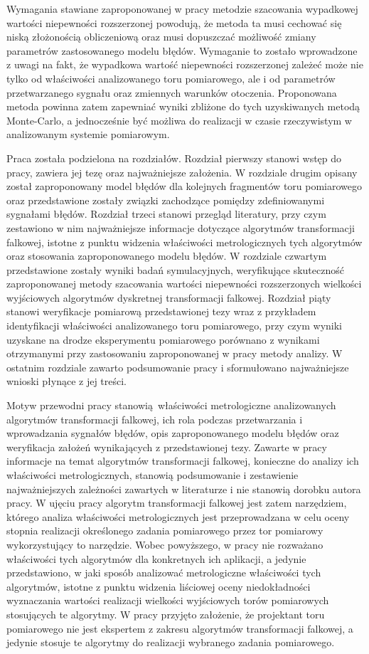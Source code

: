 Wymagania stawiane zaproponowanej w pracy metodzie szacowania wypadkowej wartości niepewności rozszerzonej powodują, że metoda ta musi cechować się niską złożonością obliczeniową oraz musi dopuszczać możliwość zmiany parametrów zastosowanego modelu błędów. Wymaganie to zostało wprowadzone z uwagi na fakt, że wypadkowa wartość niepewności rozszerzonej zależeć może nie tylko od właściwości analizowanego toru pomiarowego, ale i od parametrów przetwarzanego sygnału oraz zmiennych warunków otoczenia. Proponowana metoda powinna zatem zapewniać wyniki zbliżone do tych uzyskiwanych metodą Monte-Carlo, a jednocześnie być możliwa do realizacji w czasie rzeczywistym w analizowanym systemie pomiarowym.

Praca została podzielona na  rozdziałów. Rozdział pierwszy stanowi wstęp do pracy, zawiera jej tezę oraz najważniejsze założenia. W rozdziale drugim opisany został zaproponowany model błędów dla kolejnych fragmentów toru pomiarowego oraz przedstawione zostały związki zachodzące pomiędzy zdefiniowanymi sygnałami błędów. Rozdział trzeci stanowi przegląd literatury, przy czym zestawiono w nim najważniejsze informacje dotyczące algorytmów transformacji falkowej, istotne z punktu widzenia właściwości metrologicznych tych algorytmów oraz stosowania zaproponowanego modelu błędów. W rozdziale czwartym przedstawione zostały wyniki badań symulacyjnych, weryfikujące skuteczność zaproponowanej metody szacowania wartości niepewności rozszerzonych wielkości wyjściowych algorytmów dyskretnej transformacji falkowej. Rozdział piąty stanowi weryfikacje pomiarową przedstawionej tezy wraz z przykładem identyfikacji właściwości analizowanego toru pomiarowego, przy czym wyniki uzyskane na drodze eksperymentu pomiarowego porównano z wynikami otrzymanymi przy zastosowaniu zaproponowanej w pracy metody analizy. W ostatnim rozdziale zawarto podsumowanie pracy i sformułowano najważniejsze wnioski płynące z jej treści.

Motyw przewodni pracy stanowią właściwości metrologiczne analizowanych algorytmów transformacji falkowej, ich rola podczas przetwarzania i wprowadzania sygnałów błędów, opis zaproponowanego modelu błędów oraz weryfikacja założeń wynikających z przedstawionej tezy. Zawarte w pracy informacje na temat algorytmów transformacji falkowej, konieczne do analizy ich właściwości metrologicznych, stanowią podsumowanie i zestawienie najważniejszych zależności zawartych w literaturze i nie stanowią dorobku autora pracy. W ujęciu pracy algorytm transformacji falkowej jest zatem narzędziem, którego analiza właściwości metrologicznych jest przeprowadzana w celu oceny stopnia realizacji określonego zadania pomiarowego przez tor pomiarowy wykorzystujący to narzędzie. Wobec powyższego, w pracy nie rozważano właściwości tych algorytmów dla konkretnych ich aplikacji, a jedynie przedstawiono, w jaki sposób analizować metrologiczne właściwości tych algorytmów, istotne z punktu widzenia liściowej oceny niedokładności wyznaczania wartości realizacji wielkości wyjściowych torów pomiarowych stosujących te algorytmy. W pracy przyjęto założenie, że projektant toru pomiarowego nie jest ekspertem z zakresu algorytmów transformacji falkowej, a jedynie stosuje te algorytmy do realizacji wybranego zadania pomiarowego.

